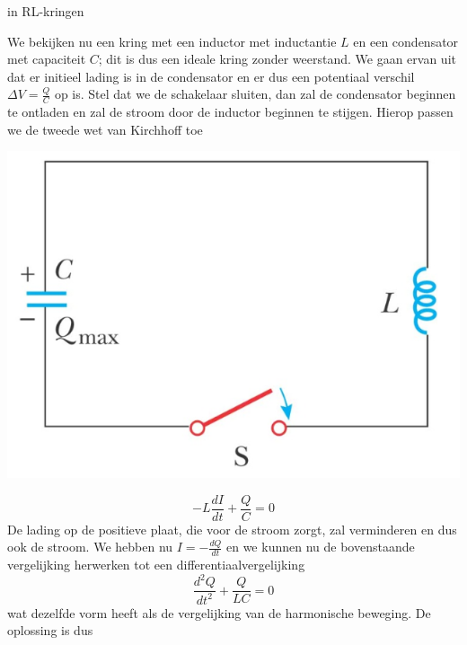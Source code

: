 \begin{app}[LC-kringen]{in RL-kringen}
    \vspace{-0.2cm}
    \begin{minipage}{.73\textwidth}
        We bekijken nu een kring met een inductor met inductantie $L$ en een condensator met capaciteit $C$; dit is dus een ideale kring zonder weerstand. 
        We gaan ervan uit dat er initieel lading is in de condensator en er dus een potentiaal verschil $\Delta V = \tfrac{Q}{C}$ op is. Stel dat we de schakelaar sluiten, 
        dan zal de condensator beginnen te ontladen en zal de stroom door de inductor beginnen te stijgen. Hierop passen we de tweede wet van Kirchhoff toe
    \end{minipage}
    \begin{minipage}{.23\textwidth}
        \vspace{0.3cm}\includegraphics[scale = 0.35]{Images/Magnetisme/LCKring}
    \end{minipage}
    \vspace{-0.3cm}
    \begin{equation*}
        -L\dfrac{dI}{dt} + \dfrac{Q}{C} = 0
    \end{equation*}
    De lading op de positieve plaat, die voor de stroom zorgt, zal verminderen en dus ook de stroom. We hebben nu $I = -\tfrac{dQ}{dt}$ en we kunnen nu de bovenstaande vergelijking herwerken tot
    een differentiaalvergelijking
    \begin{equation*}
        \dfrac{d^{2}Q}{dt^{2}} + \dfrac{Q}{LC} = 0
    \end{equation*}
    wat dezelfde vorm heeft als de vergelijking van de harmonische beweging. De oplossing is dus


\end{app}
